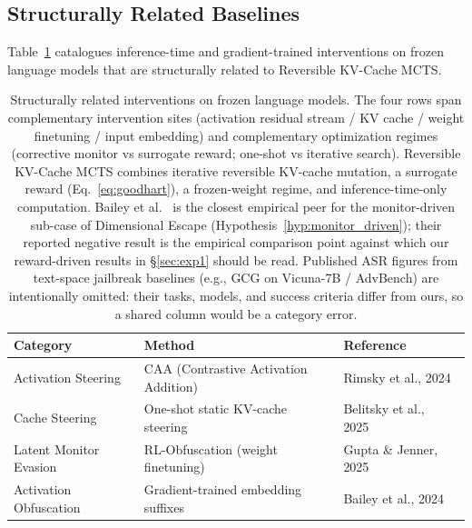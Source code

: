 \subsection{Structurally Related Baselines}\label{sec:appendix-baselines}
Table~\ref{tab:baselines} catalogues inference-time and gradient-trained interventions on frozen language models that are structurally related to Reversible KV-Cache MCTS.
\begin{table}[t]
\centering
\small
\begin{tabular}{@{}lll@{}}
\toprule
\textbf{Category} & \textbf{Method} & \textbf{Reference} \\
\midrule
Activation Steering & CAA (Contrastive Activation Addition) & Rimsky et al., 2024~\cite{rimsky2024steering} \\
Cache Steering & One-shot static KV-cache steering & Belitsky et al., 2025~\cite{belitsky2025kvcache} \\
Latent Monitor Evasion & RL-Obfuscation (weight finetuning) & Gupta \& Jenner, 2025~\cite{gupta2025rlobfuscation} \\
Activation Obfuscation & Gradient-trained embedding suffixes & Bailey et al., 2024~\cite{bailey2024obfuscated} \\
\bottomrule
\end{tabular}
\caption{Structurally related interventions on frozen language models. The four rows span complementary intervention sites (activation residual stream / KV cache / weight finetuning / input embedding) and complementary optimization regimes (corrective monitor vs surrogate reward; one-shot vs iterative search). Reversible KV-Cache MCTS combines iterative reversible KV-cache mutation, a surrogate reward (Eq.~\ref{eq:goodhart}), a frozen-weight regime, and inference-time-only computation. Bailey et al.~\cite{bailey2024obfuscated} is the closest empirical peer for the monitor-driven sub-case of Dimensional Escape (Hypothesis~\ref{hyp:monitor_driven}); their reported negative result is the empirical comparison point against which our reward-driven results in §\ref{sec:exp1} should be read. Published ASR figures from text-space jailbreak baselines (e.g., GCG on Vicuna-7B / AdvBench) are intentionally omitted: their tasks, models, and success criteria differ from ours, so a shared column would be a category error.}
\label{tab:baselines}
\end{table}

